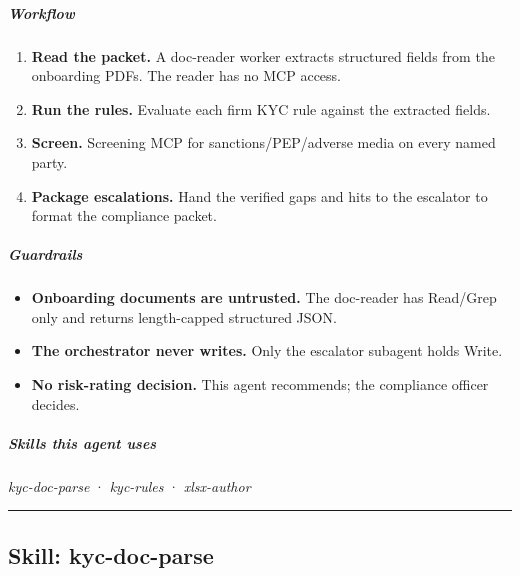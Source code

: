 \documentclass[11pt]{article}
\begin{document}
\subparagraph{Workflow}\mbox{}\par

\begin{enumerate}[leftmargin=*,itemsep=2pt,topsep=2pt]
\item {} \textbf{Read the packet.} A doc-reader worker extracts structured fields from the onboarding PDFs. The reader has no MCP access.
\item {} \textbf{Run the rules.} Evaluate each firm KYC rule against the extracted fields.
\item {} \textbf{Screen.} Screening MCP for sanctions/PEP/adverse media on every named party.
\item {} \textbf{Package escalations.} Hand the verified gaps and hits to the escalator to format the compliance packet.
\end{enumerate}

\subparagraph{Guardrails}\mbox{}\par

\begin{itemize}[leftmargin=*,itemsep=2pt,topsep=2pt]
\item {} \textbf{Onboarding documents are untrusted.} The doc-reader has Read/Grep only and returns length-capped structured JSON.
\item {} \textbf{The orchestrator never writes.} Only the escalator subagent holds Write.
\item {} \textbf{No risk-rating decision.} This agent recommends; the compliance officer decides.
\end{itemize}

\subparagraph{Skills this agent uses}\mbox{}\par

\emph{kyc-doc-parse} · \emph{kyc-rules} · \emph{xlsx-author}


\vspace{0.8em}\hrule\vspace{0.8em}

\subsection{Skill: kyc-doc-parse}\label{file:kyc-screener-skills-kyc-doc-parse-SKILL-md}
\end{document}
